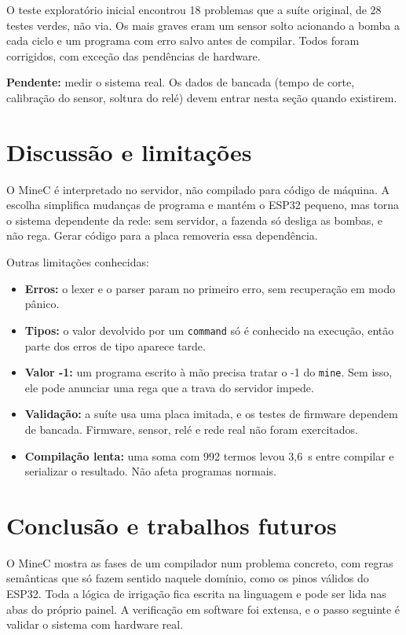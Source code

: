 \documentclass[11pt,a4paper]{article}
\newcommand{\cod}[1]{\texttt{#1}}
\begin{document}
O teste exploratório inicial encontrou 18 problemas que a suíte original, de 28 testes verdes, não via. Os mais graves eram um sensor solto acionando a bomba a cada ciclo e um programa com erro salvo antes de compilar. Todos foram corrigidos, com exceção das pendências de hardware.

\textbf{Pendente:} medir o sistema real. Os dados de bancada (tempo de corte, calibração do sensor, soltura do relé) devem entrar nesta seção quando existirem.

\section{Discussão e limitações}\label{sec:discussao}

O MineC é interpretado no servidor, não compilado para código de máquina. A escolha simplifica mudanças de programa e mantém o ESP32 pequeno, mas torna o sistema dependente da rede: sem servidor, a fazenda só desliga as bombas, e não rega. Gerar código para a placa removeria essa dependência.

Outras limitações conhecidas:

\begin{itemize}
  \item \textbf{Erros:} o lexer e o parser param no primeiro erro, sem recuperação em modo pânico.
  \item \textbf{Tipos:} o valor devolvido por um \cod{command} só é conhecido na execução, então parte dos erros de tipo aparece tarde.
  \item \textbf{Valor -1:} um programa escrito à mão precisa tratar o -1 do \cod{mine}. Sem isso, ele pode anunciar uma rega que a trava do servidor impede.
  \item \textbf{Validação:} a suíte usa uma placa imitada, e os testes de firmware dependem de bancada. Firmware, sensor, relé e rede real não foram exercitados.
  \item \textbf{Compilação lenta:} uma soma com 992 termos levou 3,6~s entre compilar e serializar o resultado. Não afeta programas normais.
\end{itemize}

\section{Conclusão e trabalhos futuros}\label{sec:conclusao}

O MineC mostra as fases de um compilador num problema concreto, com regras semânticas que só fazem sentido naquele domínio, como os pinos válidos do ESP32. Toda a lógica de irrigação fica escrita na linguagem e pode ser lida nas abas do próprio painel. A verificação em software foi extensa, e o passo seguinte é validar o sistema com hardware real.
\end{document}
